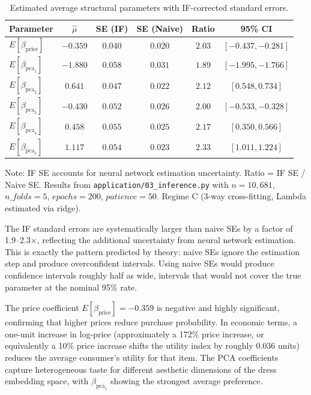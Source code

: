 \begin{table}[ht]
\centering
\caption{Estimated average structural parameters with IF-corrected standard errors.}\label{tab:main_results}
\begin{tabular}{lccccc}
\toprule
\textbf{Parameter} & $\hat{\mu}$ & \textbf{SE (IF)} & \textbf{SE (Naive)} & \textbf{Ratio} & \textbf{95\% CI} \\
\midrule
$E[\beta_{\text{price}}]$ & $-0.359$ & $0.040$ & $0.020$ & $2.03$ & $[-0.437, -0.281]$ \\
$E[\beta_{\text{pca}_1}]$ & $-1.880$ & $0.058$ & $0.031$ & $1.89$ & $[-1.995, -1.766]$ \\
$E[\beta_{\text{pca}_2}]$ & $0.641$ & $0.047$ & $0.022$ & $2.12$ & $[0.548, 0.734]$ \\
$E[\beta_{\text{pca}_3}]$ & $-0.430$ & $0.052$ & $0.026$ & $2.00$ & $[-0.533, -0.328]$ \\
$E[\beta_{\text{pca}_4}]$ & $0.458$ & $0.055$ & $0.025$ & $2.17$ & $[0.350, 0.566]$ \\
$E[\beta_{\text{pca}_5}]$ & $1.117$ & $0.054$ & $0.023$ & $2.33$ & $[1.011, 1.224]$ \\
\bottomrule
\end{tabular}
\begin{tablenotes}\small
\item Note: IF SE accounts for neural network estimation uncertainty. Ratio = IF SE / Naive SE. Results from \texttt{application/03\_inference.py} with $n=10{,}681$, $n\_folds=5$, $epochs=200$, $patience=50$. Regime C (3-way cross-fitting, Lambda estimated via ridge).
\end{tablenotes}
\end{table}

The IF standard errors are systematically larger than naive SEs by a factor of 1.9--2.3$\times$, reflecting the additional uncertainty from neural network estimation. This is exactly the pattern predicted by theory: naive SEs ignore the estimation step and produce overconfident intervals. Using naive SEs would produce confidence intervals roughly half as wide, intervals that would not cover the true parameter at the nominal 95\% rate.

The price coefficient $E[\beta_{\text{price}}] = -0.359$ is negative and highly significant, confirming that higher prices reduce purchase probability. In economic terms, a one-unit increase in log-price (approximately a 172\% price increase, or equivalently a 10\% price increase shifts the utility index by roughly $0.036$ units) reduces the average consumer's utility for that item. The PCA coefficients capture heterogeneous taste for different aesthetic dimensions of the dress embedding space, with $\beta_{\text{pca}_1}$ showing the strongest average preference.

